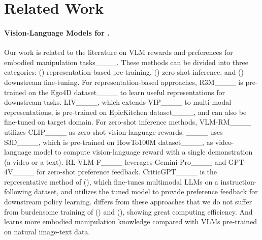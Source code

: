 \section{Related Work}
\paragraph{Vision-Language Models for \RL.}

Our work is related to the literature on VLM rewards and preferences for embodied manipulation tasks____. These methods can be divided into three categories: () representation-based pre-training, () zero-shot inference, and () downstream fine-tuning.
For representation-based approaches, R3M____ is pre-trained on the Ego4D dataset____ to learn useful representations for downstream tasks. LIV____, which extends VIP____ to multi-modal representations, is pre-trained on EpicKitchen dataset____, and can also be fine-tuned on target domain.
For zero-shot inference methods, VLM-RM____ utilizes CLIP____ as zero-shot vision-language rewards.
\RC____ uses S3D____, which is pre-trained on HowTo100M dataset____, as video-language model to compute vision-language reward with a single demonstration (a video or a text).
RL-VLM-F____ leverages Gemini-Pro____ and GPT-4V____ for zero-shot preference feedback.
CriticGPT____ is the representative method of (), which fine-tunes multimodal LLMs on a instruction-following dataset, and utilizes the tuned model to provide preference feedback for downstream policy learning.
\ourmethod differs from these approaches that we do not suffer from burdensome training of () and (), showing great computing efficiency. And \ourmethod learns more embodied manipulation knowledge compared with VLMs pre-trained on natural image-text data.


